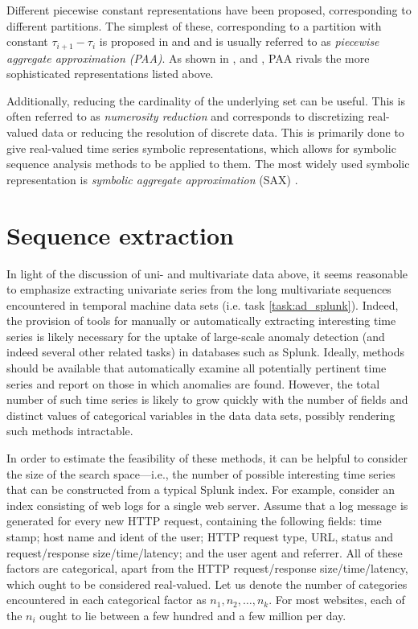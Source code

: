 Different piecewise constant representations have been proposed, corresponding to different partitions. The simplest of these, corresponding to a partition with constant $\tau_{i+1} - \tau_i$ is proposed in \cite{keogh4} and \cite{faloutsos2} and is usually referred to as \emph{piecewise aggregate approximation (PAA)}. As shown in \cite{keogh5}, \cite{keogh3} and \cite{faloutsos2}, PAA rivals the more sophisticated representations listed above. 

Additionally, reducing the cardinality of the underlying set can be useful. This is often referred to as \emph{numerosity reduction} and corresponds to discretizing real-valued data or reducing the resolution of discrete data. This is primarily done to give real-valued time series symbolic representations, which allows for symbolic sequence analysis methods to be applied to them. The most widely used symbolic representation is \emph{symbolic aggregate approximation} (SAX) \cite{sax}.

\section{Sequence extraction}
\label{sect:series_mining}

In light of the discussion of uni- and multivariate data above, it seems reasonable to emphasize extracting univariate series from the long multivariate sequences encountered in temporal machine data sets (i.e. task \ref{task:ad_splunk}). Indeed, the provision of tools for manually or automatically extracting interesting time series is likely necessary for the uptake of large-scale anomaly detection (and indeed several other related tasks) in databases such as Splunk. Ideally, methods should be available that automatically examine all potentially pertinent time series and report on those in which anomalies are found. However, the total number of such time series is likely to grow quickly with the number of fields and distinct values of categorical variables in the data data sets, possibly rendering such methods intractable.

In order to estimate the feasibility of these methods, it can be helpful to consider the size of the search space---i.e., the number of possible interesting time series that can be constructed from a typical Splunk index. For example, consider an index consisting of web logs for a single web server. Assume that a log message is generated for every new HTTP request, containing the following fields: time stamp; host name and ident of the user; HTTP request type, URL, status and request/response size/time/latency; and the user agent and referrer. All of these factors are categorical, apart from the HTTP request/response size/time/latency, which ought to be considered real-valued. Let us denote the number of categories encountered in each categorical factor as $n_1, n_2, \dots, n_k$. For most websites, each of the $n_i$ ought to lie between a few hundred and a few million per day.

